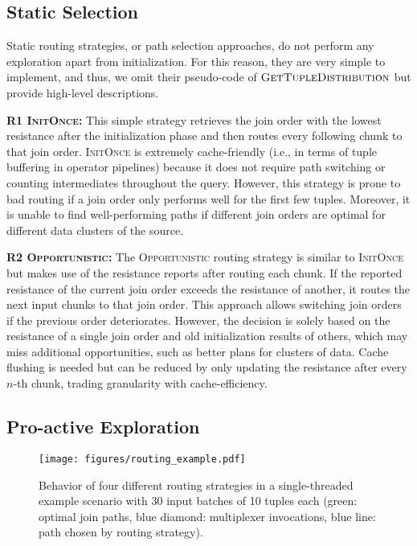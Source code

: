 \subsection{Static Selection}

Static routing strategies, or path selection approaches, do not perform any exploration apart from initialization. For this reason, they are very simple to implement, and thus, we omit their pseudo-code of $\textsc{GetTupleDistribution}$ but provide high-level descriptions.

\textbf{R1 \textsc{InitOnce}:} This simple strategy retrieves the join order with the lowest resistance after the initialization phase and then routes every following chunk to that join order. \textsc{InitOnce} is extremely cache-friendly (i.e., in terms of tuple buffering in operator pipelines) because it does not require path switching or counting intermediates throughout the query. However, this strategy is prone to bad routing if a join order only performs well for the first few tuples. Moreover, it is unable to find well-performing paths if different join orders are optimal for different data clusters of the source.

\textbf{R2 \textsc{Opportunistic}:} The \textsc{Opportunistic} routing strategy is similar to \textsc{InitOnce} but makes use of the resistance reports after routing each chunk. If the reported resistance of the current join order exceeds the resistance of another, it routes the next input chunks to that join order. This approach allows switching join orders if the previous order deteriorates. However, the decision is solely based on the resistance of a single join order and old initialization results of others, which may miss additional opportunities, such as better plans for clusters of data. Cache flushing is needed but can be reduced by only updating the resistance after every $n$-th chunk, trading granularity with cache-efficiency.  

\subsection{Pro-active Exploration}

\begin{figure*}[!t]
    \centering
    \texttt{[image: figures/routing\_example.pdf]}
		\vspace{-0.2cm}
    \caption{Behavior of four different routing strategies in a single-threaded example scenario with 30 input batches of 10 tuples each (green: optimal join paths, blue diamond: multiplexer invocations, blue line: path chosen by routing strategy).}
    \vspace{-0.1cm}
    \label{fig:routing_example}
\end{figure*}

